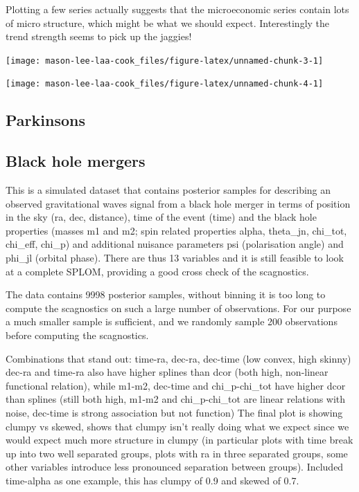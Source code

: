 Plotting a few series actually suggests that the microeconomic series
contain lots of micro structure, which might be what we should expect.
Interestingly the trend strength seems to pick up the jaggies!

\begin{Schunk}

\texttt{[image: mason-lee-laa-cook\_files/figure-latex/unnamed-chunk-3-1]} \end{Schunk}

\begin{Schunk}

\texttt{[image: mason-lee-laa-cook\_files/figure-latex/unnamed-chunk-4-1]} \end{Schunk}

\hypertarget{parkinsons}{%
\subsection{Parkinsons}\label{parkinsons}}

\hypertarget{black-hole-mergers}{%
\subsection{Black hole mergers}\label{black-hole-mergers}}

This is a simulated dataset that contains posterior samples for
describing an observed gravitational waves signal from a black hole
merger in terms of position in the sky (ra, dec, distance), time of the
event (time) and the black hole properties (masses m1 and m2; spin
related properties alpha, theta\_jn, chi\_tot, chi\_eff, chi\_p) and
additional nuisance parameters psi (polarisation angle) and phi\_jl
(orbital phase). There are thus 13 variables and it is still feasible to
look at a complete SPLOM, providing a good cross check of the
scagnostics.

The data contains 9998 posterior samples, without binning it is too long
to compute the scagnostics on such a large number of observations. For
our purpose a much smaller sample is sufficient, and we randomly sample
200 observations before computing the scagnostics.

Combinations that stand out: time-ra, dec-ra, dec-time (low convex, high
skinny) dec-ra and time-ra also have higher splines than dcor (both
high, non-linear functional relation), while m1-m2, dec-time and
chi\_p-chi\_tot have higher dcor than splines (still both high, m1-m2
and chi\_p-chi\_tot are linear relations with noise, dec-time is strong
association but not function) The final plot is showing clumpy vs
skewed, shows that clumpy isn't really doing what we expect since we
would expect much more structure in clumpy (in particular plots with
time break up into two well separated groups, plots with ra in three
separated groups, some other variables introduce less pronounced
separation between groups). Included time-alpha as one example, this has
clumpy of 0.9 and skewed of 0.7.


